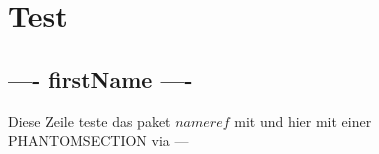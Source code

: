 \documentclass[../Report.tex]{subfiles}
\begin{document}
\chapter{Test}
\label{chap:test}

\section{---- firstName ----}
\label{sec:test_firstName}

Diese Zeile teste das paket $ nameref$ mit  und hier mit einer PHANTOMSECTION via ---

%
%
%		
%		
%
%
%
%
%
%		
%
\end{document}
